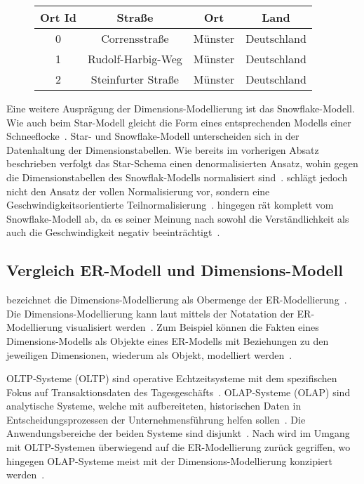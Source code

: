 \documentclass[
  language=german, %
  type=bachelor%
]{isthesis}
\begin{document}
\begin{content}
  \begin{figure}[caption={Beispiel der Dimensionstabelle \textit{Ort}}, label={table:dimension-table}]
    \begin{tabular}{c c c c}
      Ort Id & Straße & Ort & Land \\
      \toprule
      0 & Corrensstraße & Münster & Deutschland \\
      1 & Rudolf-Harbig-Weg & Münster & Deutschland \\
      2 & Steinfurter Straße & Münster & Deutschland \\
    \end{tabular}
  \end{figure}

  Eine weitere Ausprägung der Dimensions-Modellierung ist das Snowflake-Modell.
  Wie auch beim Star-Modell gleicht die Form eines entsprechenden Modells einer
  Schneeflocke~\cite[][S. 70]{Kemper2010}. Star- und Snowflake-Modell
  unterscheiden sich in der Datenhaltung der Dimensionstabellen. Wie bereits im
  vorherigen Absatz beschrieben verfolgt das Star-Schema einen denormalisierten
  Ansatz, wohin gegen die Dimensionstabellen des Snowflak-Modells normalisiert
  sind~\cite[][S. 70]{Kemper2010}. \textsc{\citeauthor{Kemper2010}} schlägt
  jedoch nicht den Ansatz der vollen Normalisierung vor, sondern eine
  Geschwindigkeitsorientierte Teilnormalisierung~\cite[][S. 70]{Kemper2010}.
  \textsc{\citeauthor{Kimball2013}} hingegen rät komplett vom Snowflake-Modell
  ab, da es seiner Meinung nach sowohl die Verständlichkeit als auch \ggf{} die
  Geschwindigkeit negativ beeinträchtigt~\cite[][S. 50]{Kimball2013}.

  \subsection{Vergleich ER-Modell und Dimensions-Modell}
  \textsc{\citeauthor{ballard1998data}} bezeichnet die Dimensions-Modellierung
  als Obermenge der ER-Modellierung~\cite[][S. 47]{ballard1998data}. Die
  Dimensions-Modellierung kann laut \textsc{\citeauthor{ballard1998data}}
  mittels der Notatation der ER-Modellierung visualisiert werden~\cite[][S.
  47]{ballard1998data}. Zum Beispiel können die Fakten eines Dimensions-Modells
  als Objekte eines ER-Modells mit Beziehungen zu den jeweiligen Dimensionen,
  wiederum als Objekt, modelliert werden~\cite[][S. 48]{ballard1998data}. 

  \acrlong{OLTP}-Systeme (OLTP) sind operative Echtzeitsysteme mit dem
  spezifischen Fokus auf Transaktionsdaten des Tagesgeschäfts~\cite[][S.
  11]{gabriel2009data}. \acrlong{OLAP}-Systeme (OLAP) sind analytische Systeme,
  welche mit aufbereiteten, historischen Daten in Entscheidungsprozessen der
  Unternehmensführung helfen sollen~\cite[][S. 1]{chaudhuri1997overview}. Die
  Anwendungsbereiche der beiden Systeme sind disjunkt~\cite[][S.
  334]{chamoni2000line}. Nach \textsc{\citeauthor{phipps2002automating}} wird
  im Umgang mit \acrshort{OLTP}-Systemen überwiegend auf die ER-Modellierung
  zurück gegriffen, wo hingegen \acrshort{OLAP}-Systeme meist mit der
  Dimensions-Modellierung konzipiert werden~\cite[][S.
  2]{phipps2002automating}. 


\end{content}
\end{document}
